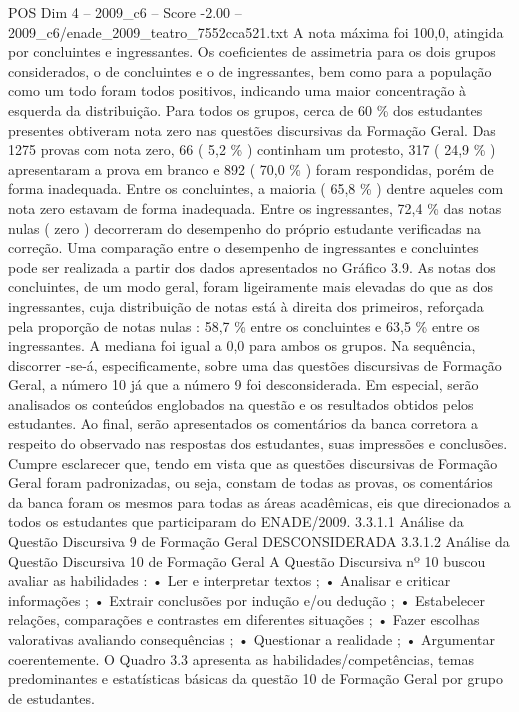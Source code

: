 \begin{textsample}{POS Dim 4 – 2009\_c6 – Score -2.00 – 2009\_c6/enade\_2009\_teatro\_7552cca521.txt}
A nota máxima foi 100,0, atingida por concluintes e ingressantes.
Os coeficientes de assimetria para os dois grupos considerados, o de concluintes e o de ingressantes, bem como para a população como um todo foram todos positivos, indicando uma maior concentração à esquerda da distribuição.
Para todos os grupos, cerca de 60 \% dos estudantes presentes obtiveram nota zero nas questões discursivas da Formação Geral.
Das 1275 provas com nota zero, 66 ( 5,2 \% ) continham um protesto, 317 ( 24,9 \% ) apresentaram a prova em branco e 892 ( 70,0 \% ) foram respondidas, porém de forma inadequada.
Entre os concluintes, a maioria ( 65,8 \% ) dentre aqueles com nota zero estavam de forma inadequada.
Entre os ingressantes, 72,4 \% das notas nulas ( zero ) decorreram do desempenho do próprio estudante verificadas na correção.
Uma comparação entre o desempenho de ingressantes e concluintes pode ser realizada a partir dos dados apresentados no Gráfico 3.9.
As notas dos concluintes, de um modo geral, foram ligeiramente mais elevadas do que as dos ingressantes, cuja distribuição de notas está à direita dos primeiros, reforçada pela proporção de notas nulas : 58,7 \% entre os concluintes e 63,5 \% entre os ingressantes.
A mediana foi igual a 0,0 para ambos os grupos.
Na sequência, discorrer -se-á, especificamente, sobre uma das questões discursivas de Formação Geral, a número 10 já que a número 9 foi desconsiderada.
Em especial, serão analisados os conteúdos englobados na questão e os resultados obtidos pelos estudantes.
Ao final, serão apresentados os comentários da banca corretora a respeito do observado nas respostas dos estudantes, suas impressões e conclusões.
Cumpre esclarecer que, tendo em vista que as questões discursivas de Formação Geral foram padronizadas, ou seja, constam de todas as provas, os comentários da banca foram os mesmos para todas as áreas acadêmicas, eis que direcionados a todos os estudantes que participaram do ENADE/2009. 3.3.1.1 Análise da Questão Discursiva 9 de Formação Geral DESCONSIDERADA 3.3.1.2 Análise da Questão Discursiva 10 de Formação Geral A Questão Discursiva nº 10 buscou avaliar as habilidades : • Ler e interpretar textos ; • Analisar e criticar informações ; • Extrair conclusões por indução e/ou dedução ; • Estabelecer relações, comparações e contrastes em diferentes situações ; • Fazer escolhas valorativas avaliando consequências ; • Questionar a realidade ; • Argumentar coerentemente.
O Quadro 3.3 apresenta as habilidades/competências, temas predominantes e estatísticas básicas da questão 10 de Formação Geral por grupo de estudantes.

\end{textsample}
